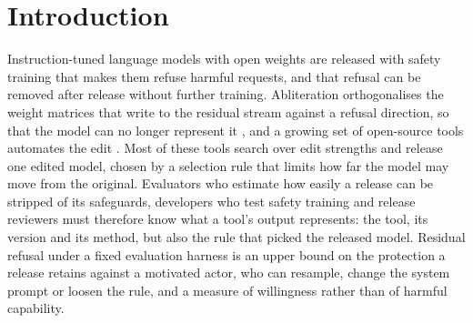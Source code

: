 \section{Introduction}
\label{sec:intro}

Instruction-tuned language models with open weights are released with safety training that makes them refuse
harmful requests, and that refusal can be removed after release without further training. Abliteration orthogonalises
the weight matrices that write to the residual stream against a refusal direction, so that the model can no longer
represent it \cite{arditi2024refusal}, and a growing set of open-source tools automates the edit
\cite{labonne2024abliteration,failspy_abliterator,erisforge,jimplus_llmabliteration,heretic2025,obliteratus2026,jwest33abliterator}.
Most of these tools search over edit strengths and release one edited model, chosen by a selection rule that limits
how far the model may move from the original. Evaluators who estimate how easily a release can be stripped of its
safeguards, developers who test safety training and release reviewers must therefore know what a tool's output
represents: the tool, its version and its method, but also the rule that picked the released model. Residual refusal
under a fixed evaluation harness is an upper bound on the protection a release retains against a motivated actor, who
can resample, change the system prompt or loosen the rule, and a measure of willingness rather than of harmful
capability.

